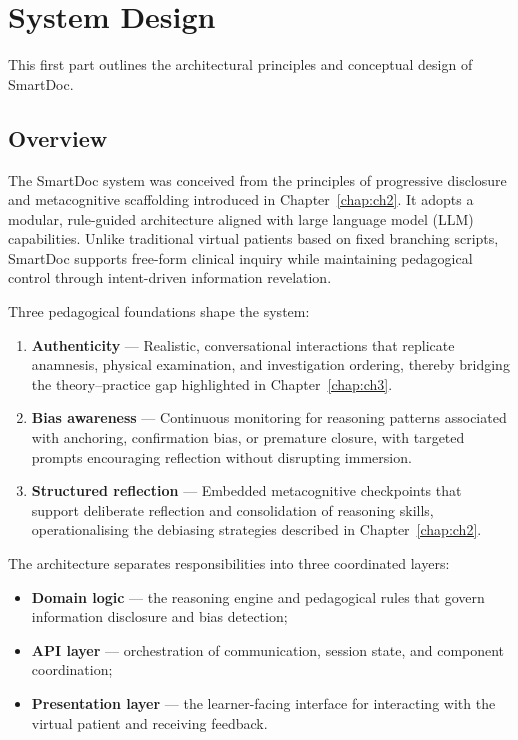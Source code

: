 \section{System Design}
\label{sec:system_design}

This first part outlines the architectural principles and conceptual design of
SmartDoc.

\subsection{Overview}

The SmartDoc system was conceived from the principles of progressive disclosure
and metacognitive scaffolding introduced in Chapter~\ref{chap:ch2}.
It adopts a modular, rule-guided architecture aligned with large language model (LLM)
capabilities.
Unlike traditional virtual patients based on fixed branching scripts, SmartDoc
supports free-form clinical inquiry while maintaining pedagogical control through
intent-driven information revelation.

Three pedagogical foundations shape the system:

\begin{enumerate}
  \item \textbf{Authenticity} — Realistic, conversational interactions that
  replicate anamnesis, physical examination, and investigation ordering, thereby
  bridging the theory–practice gap highlighted in Chapter~\ref{chap:ch3}.
  \item \textbf{Bias awareness} — Continuous monitoring for reasoning patterns
  associated with anchoring, confirmation bias, or premature closure, with
  targeted prompts encouraging reflection without disrupting immersion.
  \item \textbf{Structured reflection} — Embedded metacognitive checkpoints that
  support deliberate reflection and consolidation of reasoning skills,
  operationalising the debiasing strategies described in Chapter~\ref{chap:ch2}.
\end{enumerate}

The architecture separates responsibilities into three coordinated layers:

\begin{itemize}
  \item \textbf{Domain logic} — the reasoning engine and pedagogical rules that
  govern information disclosure and bias detection;
  \item \textbf{API layer} — orchestration of communication, session state, and
  component coordination;
  \item \textbf{Presentation layer} — the learner-facing interface for
  interacting with the virtual patient and receiving feedback.
\end{itemize}

